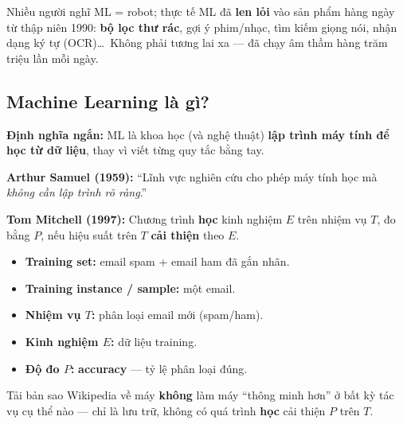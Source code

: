 \documentclass[12pt,a4paper]{article}
\begin{document}
\begin{ynghia}[title={ML đã có mặt trong đời sống}]
Nhiều người nghĩ ML = robot; thực tế ML đã \textbf{len lỏi} vào sản phẩm hàng ngày từ thập niên 1990: \textbf{bộ lọc thư rác}, gợi ý phim/nhạc, tìm kiếm giọng nói, nhận dạng ký tự (OCR)\ldots\ Không phải tương lai xa --- đã chạy âm thầm hàng trăm triệu lần mỗi ngày.
\end{ynghia}

\subsection{Machine Learning là gì?}

\begin{dinhnghia}[title={Học máy (Machine Learning)}]
\textbf{Định nghĩa ngắn:} ML là khoa học (và nghệ thuật) \textbf{lập trình máy tính để học từ dữ liệu}, thay vì viết từng quy tắc bằng tay.

\medskip
\textbf{Arthur Samuel (1959):} ``Lĩnh vực nghiên cứu cho phép máy tính học mà \emph{không cần lập trình rõ ràng}.''

\medskip
\textbf{Tom Mitchell (1997):} Chương trình \textbf{học} kinh nghiệm $E$ trên nhiệm vụ $T$, đo bằng $P$, nếu hiệu suất trên $T$ \textbf{cải thiện} theo $E$.
\end{dinhnghia}

\begin{ynghia}[title={Thuật ngữ cốt lõi (ví dụ spam filter)}]
\begin{itemize}
  \item \textbf{Training set:} email spam + email ham đã gắn nhãn.
  \item \textbf{Training instance / sample:} một email.
  \item \textbf{Nhiệm vụ $T$:} phân loại email mới (spam/ham).
  \item \textbf{Kinh nghiệm $E$:} dữ liệu training.
  \item \textbf{Độ đo $P$:} \textbf{accuracy} --- tỷ lệ phân loại đúng.
\end{itemize}
\end{ynghia}

\begin{luuy}[title={Không phải cứ có dữ liệu là ML}]
Tải bản sao Wikipedia về máy \textbf{không} làm máy ``thông minh hơn'' ở bất kỳ tác vụ cụ thể nào --- chỉ là lưu trữ, không có quá trình \textbf{học} cải thiện $P$ trên $T$.
\end{luuy}
\end{document}
